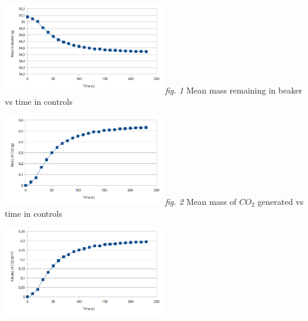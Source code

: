 \documentclass[twoside]{article}
\newcommand{\gw}{7cm}
\begin{document}
	\begin{multicols}{2}
		\begin{center}
			\includegraphics[width=\gw]{ctrl mass_b-time.png}
			\emph{fig. 1} Mean mass remaining in beaker vs time in controls
		\end{center}
		\begin{center}
			\includegraphics[width=\gw]{ctrl mass_co2-time.png}
			\emph{fig. 2} Mean mass of $CO_2$ generated vs time in controls
		\end{center}
		\begin{center}
			\includegraphics[width=\gw]{ctrl vol-time.png}

\end{center}
\end{multicols}
\end{document}
